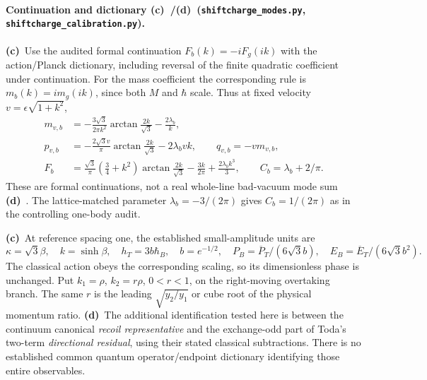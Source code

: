 \documentclass[11pt,a4paper]{article}
\newcommand{\C}{\textbf{(c)}\ }
\newcommand{\D}{\textbf{(d)}\ }
\newcommand{\file}[1]{\nolinkurl{#1}}
\newcommand{\modes}{\file{shiftcharge_modes.py}}
\newcommand{\calcheck}{\file{shiftcharge_calibration.py}}
\begin{document}
\paragraph{Continuation and dictionary \C/\D (\modes, \calcheck).}
\C Use the audited formal continuation $F_b(k)=-iF_g(ik)$ with the
action/Planck dictionary, including reversal of the finite quadratic
coefficient under continuation. For the mass coefficient the corresponding
rule is $m_b(k)=i m_g(ik)$, since both $M$ and $\hbar$ scale. Thus at
fixed velocity $v=\epsilon\sqrt{1+k^2}$,
\begin{align}
 m_{v,b}&=-\frac{3\sqrt3}{2\pi k^2}\arctan\frac{2k}{\sqrt3}
                         -\frac{2\lambda_b}{k},\\
 p_{v,b}&=-\frac{2\sqrt3 v}{\pi}\arctan\frac{2k}{\sqrt3}
                         -2\lambda_bvk,\qquad q_{v,b}=-v m_{v,b},\\
 F_b&=\frac{\sqrt3}{\pi}(\tfrac34+k^2)\arctan\frac{2k}{\sqrt3}
             -\frac{3k}{2\pi}+\frac{2\lambda_b k^3}{3},\qquad
 C_b=\lambda_b+2/\pi.\label{bad}
\end{align}
These are formal continuations, not a real whole-line bad-vacuum mode sum
\D. The lattice-matched parameter $\lambda_b=-3/(2\pi)$ gives
$C_b=1/(2\pi)$ as in the controlling one-body audit.

\C At reference spacing one, the established small-amplitude units are
\begin{equation}
 \kappa=\sqrt3\beta,\quad k=\sinh\beta,\quad
 h_T=3b\hbar_B,\quad b=e^{-1/2},\quad
 P_B=\overline P_T/(6\sqrt3b),\quad E_B=\overline E_T/(6\sqrt3b^2).
\end{equation}
The classical action obeys the corresponding scaling, so its dimensionless
phase is unchanged. Put $k_1=\rho$, $k_2=r\rho$, $0<r<1$, on the
right-moving overtaking branch. The same $r$ is the leading
$\sqrt{y_2/y_1}$ or cube root of the physical momentum ratio.
\D The additional identification tested here is between the
continuum canonical \emph{recoil representative} and the exchange-odd part
of Toda's two-term \emph{directional residual}, using their stated classical
subtractions. There is no established common quantum operator/endpoint
dictionary identifying those entire observables.
\end{document}
